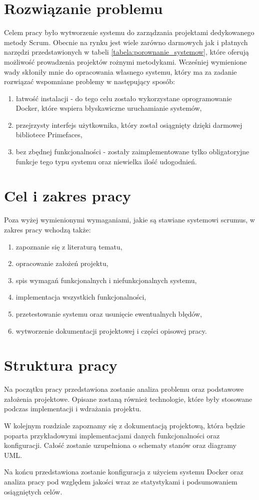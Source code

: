 \section{Rozwiązanie problemu}

Celem pracy było wytworzenie systemu do zarządzania projektami dedykowanego metody Scrum. Obecnie na rynku jest wiele zarówno darmowych jak i płatnych narzędzi przedstawionych w tabeli \ref{tabela:porownanie_systemow}, które oferują możliwość prowadzenia projektów rożnymi metodykami. Wcześniej wymienione wady skłoniły mnie do opracowania własnego systemu, który ma za zadanie rozwiązać wspomniane problemy w następujący sposób:
\begin{enumerate}
	\item łatwość instalacji - do tego celu zostało wykorzystane oprogramowanie Docker, które wspiera błyskawiczne uruchamianie systemów,
	\item przejrzysty interfejs użytkownika, który został osiągnięty dzięki darmowej bibliotece Primefaces,
	\item bez zbędnej funkcjonalności - zostały zaimplementowane tylko obligatoryjne funkcje tego typu systemu oraz niewielka ilość udogodnień.
\end{enumerate}

\section{Cel i zakres pracy}
Poza wyżej wymienionymi wymaganiami, jakie są stawiane systemowi scrumus, w zakres pracy wchodzą także:
\begin{enumerate}
	\item zapoznanie się z literaturą tematu,
	\item opracowanie założeń projektu,
	\item spis wymagań funkcjonalnych i niefunkcjonalnych systemu,
	\item implementacja wszystkich funkcjonalności,
	\item przetestowanie systemu oraz usunięcie ewentualnych błędów,
	\item wytworzenie dokumentacji projektowej i części opisowej pracy.
	
\end{enumerate}


\section{Struktura pracy}
Na początku pracy przedstawiona zostanie analiza problemu oraz podstawowe założenia projektowe. Opisane zostaną również technologie, które były stosowane podczas implementacji i wdrażania projektu. 

W kolejnym rozdziale zapoznamy się z dokumentacją projektową, która będzie poparta przykładowymi implementacjami danych funkcjonalności oraz konfiguracji. Całość zostanie uzupełniona o schematy stanów oraz diagramy UML. 

Na końcu przedstawiona zostanie konfiguracja z użyciem systemu Docker oraz analiza pracy pod względem jakości wraz ze statystykami i podsumowaniem osiągniętych celów.